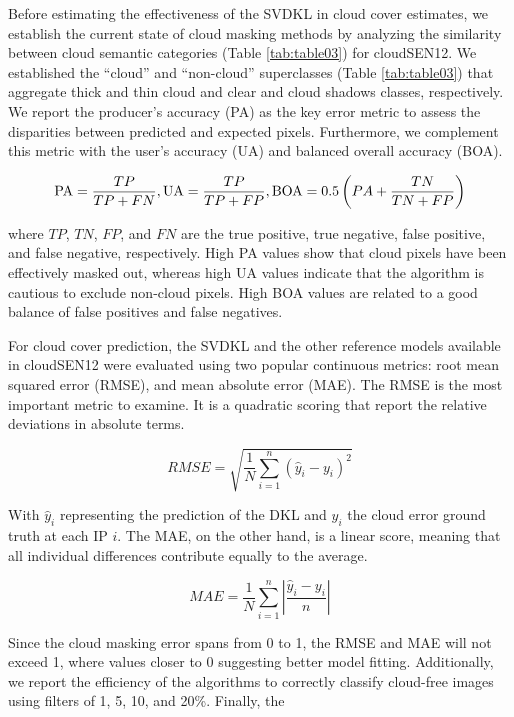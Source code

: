 \documentclass[a4paper, nobind]{templates/cdethesis}
\begin{document}
Before estimating the effectiveness of the SVDKL in cloud cover estimates, we establish the current state of cloud masking methods by analyzing the similarity between cloud semantic categories (Table \ref{tab:table03}) for cloudSEN12. We established the ``cloud'' and ``non-cloud'' superclasses (Table \ref{tab:table03}) that aggregate thick and thin cloud and clear and cloud shadows classes, respectively. We report the producer's accuracy (PA) as the key error metric to assess the disparities between predicted and expected pixels. Furthermore, we complement this metric with the user's accuracy (UA) and balanced overall accuracy (BOA).

\begin{equation}
\mathrm{PA}= \frac{TP}{TP + FN}, \\
\mathrm{UA} = \frac{TP}{TP + FP}, \\
\mathrm{BOA} = 0.5 \left (PA + \frac{TN}{TN + FP}\right)
\end{equation}

where \(TP\), \(TN\), \(FP\), and \(FN\) are the true positive, true negative, false positive, and false negative, respectively. High PA values show that cloud pixels have been effectively masked out, whereas high UA values indicate that the algorithm is cautious to exclude non-cloud pixels. High BOA values are related to a good balance of false positives and false negatives.

For cloud cover prediction, the SVDKL and the other reference models available in cloudSEN12 were evaluated using two popular continuous metrics: root mean squared error (RMSE), and mean absolute error (MAE). The RMSE is the most important metric to examine. It is a quadratic scoring that report the relative deviations in absolute terms.

\begin{equation}
    RMSE = \sqrt{\frac{1}{N}\sum_{i=1}^{n}(\hat{y}_i - y_i)^2}
\end{equation}

With \(\hat{y}_i\) representing the prediction of the DKL and \(y_i\) the cloud error ground truth at each IP \(i\). The MAE, on the other hand, is a linear score, meaning that all individual differences contribute equally to the average.

\begin{equation}
    MAE = \frac{1}{N}\sum_{i=1}^{n}\left | \frac{\hat{y}_i - y_i}{n}\right|
\end{equation}

Since the cloud masking error spans from 0 to 1, the RMSE and MAE will not exceed 1, where values closer to 0 suggesting better model fitting. Additionally, we report the efficiency of the algorithms to correctly classify cloud-free images using filters of 1, 5, 10, and 20\%. Finally, the
\end{document}
